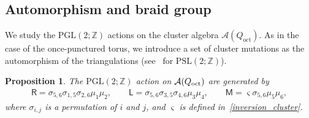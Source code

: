 \documentclass[10pt,a4paper]{amsart}
\numberwithin{equation}{section}
\newtheorem{Proposition}[Theorem]{Proposition}
 { \theoremstyle{definition}
\newtheorem{Definition}[Theorem]{Definition}
\newtheorem{Note}[Theorem]{Note}
\newtheorem{Example}[Theorem]{Example}
\newtheorem{Remark}[Theorem]{Remark} }
\begin{document}
\subsection{Automorphism and braid group}
We study the $\mathrm{PGL}(2;\mathbb{Z})$ actions on the cluster algebra $\mathcal{A}(Q_{\text{oct}})$. As in the case of the once-punctured torus, we introduce a set of cluster mutations as the automorphism of the triangulations (see~\cite{HikamiRInoue12a} for $\mathrm{PSL}(2;\mathbb{Z})$).

\begin{Proposition} The $\mathrm{PGL}(2;\mathbb{Z})$ action on $\mathcal{A}(Q_{\text{\rm oct}})$ are generated by
 \begin{gather} \label{RL_mutation}
\mathsf{R} = \sigma_{5,6} \sigma_{1,5} \sigma_{2,6} \mu_1 \mu_2 ,\qquad \mathsf{L} = \sigma_{5,6} \sigma_{3,5} \sigma_{4,6} \mu_3 \mu_4 ,\qquad \mathsf{M}= \varsigma \sigma_{5,6} \mu_5 \mu_6 ,
\end{gather}
where $\sigma_{i,j}$ is a permutation of $i$ and $j$, and $\varsigma$ is defined in~\eqref{inversion_cluster}.
\end{Proposition}
\end{document}
